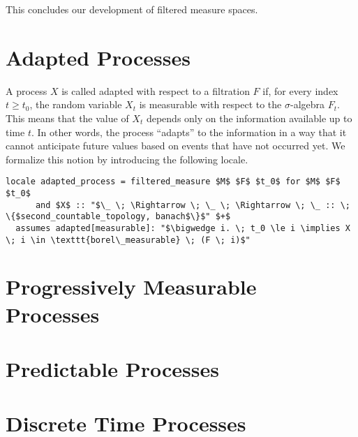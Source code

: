 This concludes our development of filtered measure spaces.

\section{Adapted Processes}

A process $X$ is called adapted with respect to a filtration $F$ if, for every index $t \ge t_0$, the random variable $X_t$ is measurable with respect to the $\sigma$-algebra $F_t$. This means that the value of $X_t$ depends only on the information available up to time $t$. In other words, the process ``adapts'' to the information in a way that it cannot anticipate future values based on events that have not occurred yet. We formalize this notion by introducing the following locale.

\begin{isalemma}
{\small
\begin{lstlisting}[style=isabelle]
locale adapted_process = filtered_measure $M$ $F$ $t_0$ for $M$ $F$ $t_0$ 
	  and $X$ :: "$\_ \; \Rightarrow \; \_ \; \Rightarrow \; \_ :: \; \{$second_countable_topology, banach$\}$" $+$
  assumes adapted[measurable]: "$\bigwedge i. \; t_0 \le i \implies X \; i \in \texttt{borel\_measurable} \; (F \; i)$"
\end{lstlisting}
}
\end{isalemma}


\section{Progressively Measurable Processes}
\section{Predictable Processes}

\section{Discrete Time Processes}
